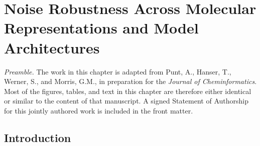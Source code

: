 \chapter{Noise Robustness Across Molecular Representations and Model Architectures}\label{chap:robustness}

\textit{Preamble.} The work in this chapter is adapted from Punt, A., Hanser, T., Werner, S., and Morris, G.M., in preparation for the \textit{Journal of Cheminformatics}. Most of the figures, tables, and text in this chapter are therefore either identical or similar to the content of that manuscript. A signed Statement of Authorship for this jointly authored work is included in the front matter.

\section{Introduction}


